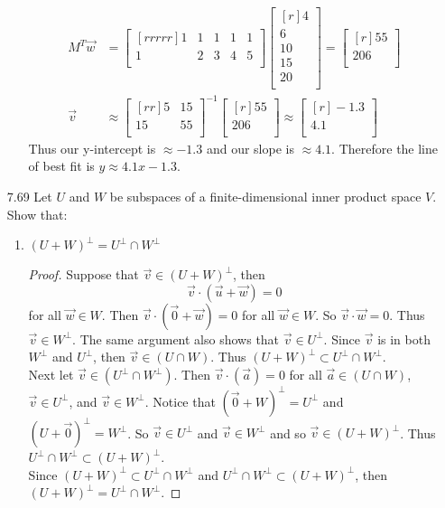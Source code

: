 \documentclass[12pt]{article}
\theoremstyle{definition}
\theoremstyle{plain}
\begin{document}
\begin{enumerate}
\begin{enumerate}
\begin{align*}
		M^T\vec{w}&=\begin{bmatrix}[rrrrr]1&1&1&1&1\\1&2&3&4&5\\\end{bmatrix}\begin{bmatrix}[r]4\\6\\10\\15\\20\\\end{bmatrix} = \begin{bmatrix}[r]55\\206\\\end{bmatrix}\\
		\vec{v}&\approx \begin{bmatrix}[rr]5&15\\15&55\\\end{bmatrix}^{-1}\begin{bmatrix}[r]55\\206\\\end{bmatrix} \approx \begin{bmatrix}[r]-1.3\\4.1\\\end{bmatrix}
		\end{align*}
		Thus our y-intercept is $\approx -1.3$ and our slope is $\approx 4.1$. Therefore the line of best fit is $y \approx 4.1x-1.3$.
	\end{enumerate}
\pagebreak
\item[7.69]Let $U$ and $W$ be subspaces of a finite-dimensional inner product space $V$. Show that:
	\begin{enumerate}
	\item $(U+W)^\perp = U^\perp \cap W^\perp$
	\begin{proof}
	Suppose that $\vec{v}\in(U+W)^\perp$, then
	\[ \vec{v}\cdot (\vec{u}+\vec{w})=0\]
	for all $\vec{w}\in W$. Then $\vec{v}\cdot (\vec{0}+\vec{w})=0$ for all $\vec{w}\in W$. So $\vec{v}\cdot \vec{w} = 0$. Thus $\vec{v}\in W^\perp$. The same argument also shows that $\vec{v}\in U^\perp$. Since $\vec{v}$ is in both $W^\perp$ and $U^\perp$, then $\vec{v}\in (U \cap W)$. Thus $(U+W)^\perp \subset U^\perp \cap W^\perp$.\\
	Next let $\vec{v}\in (U^\perp \cap W^\perp )$. Then $\vec{v}\cdot (\vec{a}) = 0$ for all $\vec{a}\in (U\cap W)$, $\vec{v}\in U^\perp$, and $\vec{v}\in W^\perp$. Notice that $(\vec{0}+W)^\perp = U^\perp$ and $(U+\vec{0})^\perp = W^\perp$. So $\vec{v}\in U^\perp$ and $\vec{v}\in W^\perp$ and so $\vec{v}\in (U+W)^\perp$. Thus $U^\perp \cap W^\perp \subset (U+W)^\perp$.\\
	Since $(U+W)^\perp \subset U^\perp \cap W^\perp$ and $U^\perp \cap W^\perp \subset (U+W)^\perp$, then $(U+W)^\perp = U^\perp \cap W^\perp$.
	\end{proof}
	\end{enumerate}


\end{enumerate}
\end{document}
